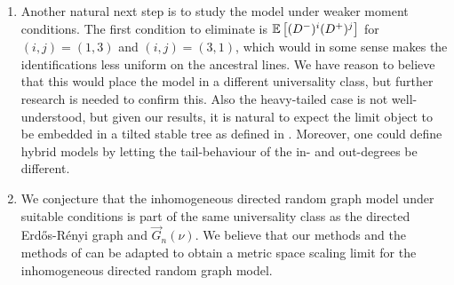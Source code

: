 \begin{enumerate}
    \item Another natural next step is to study the model under weaker moment conditions. The first condition to eliminate is ${\mathbb E}\left[(D^-)^i(D^+)^j\right]$ for $(i,j)=(1,3)$ and $(i,j)=(3,1)$, which would in some sense makes the identifications less uniform on the ancestral lines. We have reason to believe that this would place the model in  a different universality class, but further research is needed to confirm this. Also the heavy-tailed case is not well-understood, but given our results, it is natural to expect the limit object to be embedded in a tilted stable tree as defined in \cite{conchon--kerjanStableGraphMetric2020}. Moreover, one could define hybrid models by letting the tail-behaviour of the in- and out-degrees be different. 
    \item We conjecture that the inhomogeneous directed random graph model under suitable conditions is part of the same universality class as the directed Erd\H{o}s-Rényi graph \cite{goldschmidtScalingLimitCritical2019} and $\vec{G}_n(\nu)$. We believe that our methods and the methods of \cite{goldschmidtScalingLimitCritical2019} can be adapted to obtain a metric space scaling limit for the inhomogeneous directed random graph model. 

\end{enumerate}

